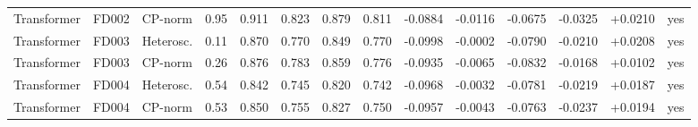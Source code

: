\documentclass[10pt,a4paper]{article}
\begin{document}
\begin{landscape}
\begin{center}
\begin{longtable}{lllccccccccccc}
Transformer & FD002 & CP-norm & 0.95 & 0.911 & 0.823 & 0.879 & 0.811 & -0.0884 & -0.0116 & -0.0675 & -0.0325 & +0.0210 & yes \\
Transformer & FD003 & Heterosc. & 0.11 & 0.870 & 0.770 & 0.849 & 0.770 & -0.0998 & -0.0002 & -0.0790 & -0.0210 & +0.0208 & yes \\
Transformer & FD003 & CP-norm & 0.26 & 0.876 & 0.783 & 0.859 & 0.776 & -0.0935 & -0.0065 & -0.0832 & -0.0168 & +0.0102 & yes \\
Transformer & FD004 & Heterosc. & 0.54 & 0.842 & 0.745 & 0.820 & 0.742 & -0.0968 & -0.0032 & -0.0781 & -0.0219 & +0.0187 & yes \\
Transformer & FD004 & CP-norm & 0.53 & 0.850 & 0.755 & 0.827 & 0.750 & -0.0957 & -0.0043 & -0.0763 & -0.0237 & +0.0194 & yes \\
\bottomrule
\end{longtable}
\end{center}\end{landscape}
\end{document}

